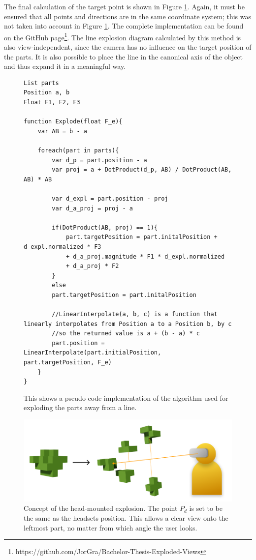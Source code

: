 The final calculation of the target point is shown in Figure \ref{fig:LineexplosionCode}.
Again, it must be ensured that all points and directions are in the same coordinate system; this was not taken into account in Figure \ref{fig:LineexplosionCode}. The complete implementation can be found on the GitHub page\footnote{https://github.com/JorGra/Bachelor-Thesis-Exploded-Views}.
The line explosion diagram calculated by this method is also view-independent, since the camera has no influence on the target position of the parts.  
It is also possible to place the line in the canonical axis of the object and thus expand it in a meaningful way.  
\begin{figure}[ht]
	\begin{lstlisting}
List parts
Position a, b
Float F1, F2, F3

function Explode(float F_e){
	var AB = b - a
	
	foreach(part in parts){
		var d_p = part.position - a
		var proj = a + DotProduct(d_p, AB) / DotProduct(AB, AB) * AB
		
		var d_expl = part.position - proj
		var d_a_proj = proj - a
		
		if(DotProduct(AB, proj) == 1){
			part.targetPosition = part.initalPosition + d_expl.normalized * F3
			+ d_a_proj.magnitude * F1 * d_expl.normalized
			+ d_a_proj * F2
		}
		else
		part.targetPosition = part.initalPosition
		
		//LinearInterpolate(a, b, c) is a function that linearly interpolates from Position a to a Position b, by c
		//so the returned value is a + (b - a) * c
		part.position = LinearInterpolate(part.initialPosition, part.targetPosition, F_e)
	}
}
	\end{lstlisting}
	\caption{This shows a pseudo code implementation of the algorithm used for exploding the parts away from a line.}
	\label{fig:LineexplosionCode}
\end{figure}

\begin{figure}[h]
	\centering
	\includegraphics[width=.65\linewidth]{fig/Images/LineExplosionHeadMounted}
	\caption[]{Concept of the head-mounted explosion. The point $P_d$ is set to be the same as the headsets position. This allows a clear view onto the leftmost part, no matter from which angle the user looks. }
	\label{fig:headExpl}
\end{figure}

